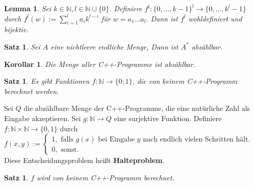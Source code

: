 \documentclass[12pt,a4paper]{article}
\theoremstyle{plain}
\newtheorem{Satz}[Theorem]{Satz}
\newtheorem{Lemma}[Theorem]{Lemma}
\newtheorem{Korollar}[Theorem]{Korollar}
\newcommand{\N}{\mathbb{N}}
\numberwithin{equation}{section}
\begin{document}
\begin{Lemma}
Sei $k\in \N, l\in \N\cup\{0\}$. Definiere $f^l: \{0,\ldots,k-1\}^l\rightarrow \{0,\ldots,k^ l-1\}$ durch $f^l(w):=\sum_{i=1}^l a_i k^{l-i}$ für $w=a_1\ldots a_l$. Dann ist $f^l$ wohldefiniert und bijektiv.
\end{Lemma}
\begin{Satz}
Sei $A$ eine nichtleere endliche Menge, Dann ist $A^*$ abzählbar.
\end{Satz}
\begin{Korollar}
Die Menge aller C++-Programme ist abzählbar.
\end{Korollar}
\begin{Satz}
Es gibt Funktionen $f: \N\rightarrow \{0;1\}$, die von keinem C++-Programm berechnet werden.
\end{Satz}
Sei $Q$ die abzählbare Menge der C++-Programme, die eine natürliche Zahl als Eingabe akzeptieren. Sei $g: \N \rightarrow Q$ eine surjektive Funktion. Definiere $f:\N\times\N \rightarrow \{0,1\}$ durch \\
$f(x,y):=\left\lbrace\begin{array}{l}
1, \text{ falls }g(x) \text{ bei Eingabe }y\text{ nach endlich vielen Schritten hält.}\\ 
0, \text{ sonst.}
\end{array} \right.$\\
Diese Entscheidungsproblem heißt \textbf{Halteproblem}.
\begin{Satz}
$f$ wird von keinem C++-Programm berechnet.
\end{Satz}
\end{document}
